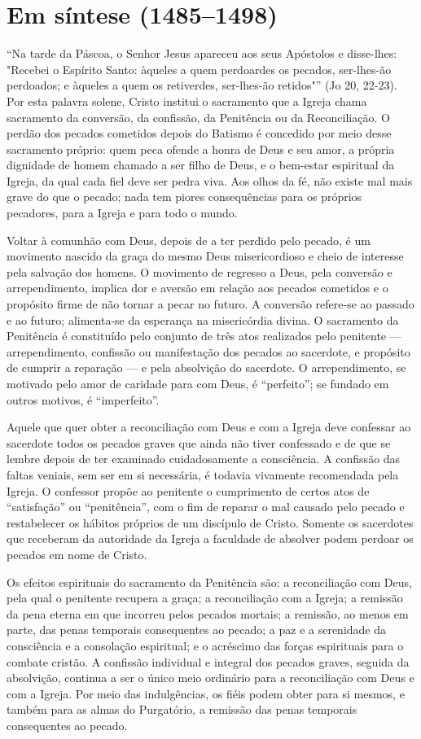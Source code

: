 \section{Em síntese (1485--1498)}

``Na tarde da Páscoa, o Senhor Jesus apareceu aos seus Apóstolos e disse-lhes: "Recebei o Espírito Santo: àqueles a quem perdoardes os pecados, ser-lhes-ão perdoados; e àqueles a quem os retiverdes, ser-lhes-ão retidos"'' (Jo 20, 22-23). Por esta palavra solene, Cristo institui o sacramento que a Igreja chama sacramento da conversão, da confissão, da Penitência ou da Reconciliação. O perdão dos pecados cometidos depois do Batismo é concedido por meio desse sacramento próprio: quem peca ofende a honra de Deus e seu amor, a própria dignidade de homem chamado a ser filho de Deus, e o bem-estar espiritual da Igreja, da qual cada fiel deve ser pedra viva. Aos olhos da fé, não existe mal mais grave do que o pecado; nada tem piores consequências para os próprios pecadores, para a Igreja e para todo o mundo.

Voltar à comunhão com Deus, depois de a ter perdido pelo pecado, é um movimento nascido da graça do mesmo Deus misericordioso e cheio de interesse pela salvação dos homens. O movimento de regresso a Deus, pela conversão e arrependimento, implica dor e aversão em relação aos pecados cometidos e o propósito firme de não tornar a pecar no futuro. A conversão refere-se ao passado e ao futuro; alimenta-se da esperança na misericórdia divina. O sacramento da Penitência é constituído pelo conjunto de três atos realizados pelo penitente --- arrependimento, confissão ou manifestação dos pecados ao sacerdote, e propósito de cumprir a reparação --- e pela absolvição do sacerdote. O arrependimento, se motivado pelo amor de caridade para com Deus, é ``perfeito''; se fundado em outros motivos, é ``imperfeito''.

Aquele que quer obter a reconciliação com Deus e com a Igreja deve confessar ao sacerdote todos os pecados graves que ainda não tiver confessado e de que se lembre depois de ter examinado cuidadosamente a consciência. A confissão das faltas veniais, sem ser em si necessária, é todavia vivamente recomendada pela Igreja. O confessor propõe ao penitente o cumprimento de certos atos de ``satisfação'' ou ``penitência'', com o fim de reparar o mal causado pelo pecado e restabelecer os hábitos próprios de um discípulo de Cristo. Somente os sacerdotes que receberam da autoridade da Igreja a faculdade de absolver podem perdoar os pecados em nome de Cristo.

Os efeitos espirituais do sacramento da Penitência são: a reconciliação com Deus, pela qual o penitente recupera a graça; a reconciliação com a Igreja; a remissão da pena eterna em que incorreu pelos pecados mortais; a remissão, ao menos em parte, das penas temporais consequentes ao pecado; a paz e a serenidade da consciência e a consolação espiritual; e o acréscimo das forças espirituais para o combate cristão. A confissão individual e integral dos pecados graves, seguida da absolvição, continua a ser o único meio ordinário para a reconciliação com Deus e com a Igreja. Por meio das indulgências, os fiéis podem obter para si mesmos, e também para as almas do Purgatório, a remissão das penas temporais consequentes ao pecado.
